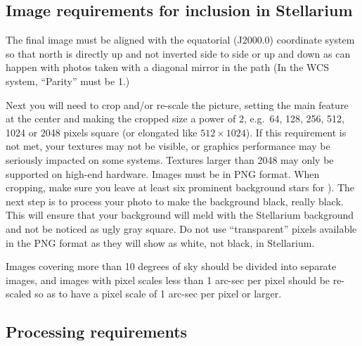 \subsection{Image requirements for inclusion in Stellarium}
\label{sec:dso:adding_images:image-requirements}

The final image must be aligned with the equatorial (J2000.0)
coordinate system so that north is directly up and not inverted side
to side or up and down as can happen with photos taken with a diagonal
mirror in the path (In the WCS system, ``Parity'' must be 1.)

Next you will need to crop and/or re-scale the picture, setting the
main feature at the center and making the cropped size a power of 2,
e.g.\ 64, 128, 256, 512, 1024 or 2048 pixels square (or elongated like
$512\times1024$). If this requirement is not met, your textures may
not be visible, or graphics performance may be seriously impacted on
some systems. Textures larger than 2048 may only be supported on
high-end hardware. Images must be in PNG format. When cropping, make
sure you leave at least six prominent background stars for
). The next step is to process your photo to
make the background black, really black. This will ensure that your
background will meld with the Stellarium background and not be noticed
as ugly gray square. Do not use ``transparent'' pixels available in
the PNG format as they will show as white, not black, in Stellarium.

Images covering more than 10 degrees of sky should be divided into
separate images, and images with pixel scales less than 1 arc-sec per
pixel should be re-scaled so as to have a pixel scale of 1 arc-sec per
pixel or larger.

\subsection{Processing requirements}
\label{sec:dso:adding_images:processing-requirements}

